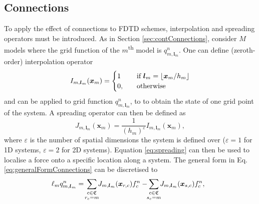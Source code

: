 \documentclass{article}
\begin{document}

\subsection{Connections}\label{sec:discConnections}

To apply the effect of connections to FDTD schemes, interpolation and spreading operators must be introduced. As in Section \ref{sec:contConnections}, consider $M$ models where the grid function of the $m$\textsuperscript{th} model is $q_{m, \boldsymbol{l}_m}^n$. One can define (zeroth-order) interpolation operator
\begin{equation}
    I_{m, \boldsymbol{l}_m}(\boldsymbol{x}_m) = \begin{cases}
    1&\quad \text{if}\ \boldsymbol{l}_m= \floor[\boldsymbol{x}_m/h_m]\\
    0, &\quad\text{otherwise}
    \end{cases}
\end{equation}
and can be applied to grid function $q_{m, \boldsymbol{l}_m}^n$, to to obtain the state of one grid point of the system. A spreading operator can then be defined as
\begin{equation}\label{eq:spreading}
    J_{m, \boldsymbol{l}_m}(\boldsymbol{x}_m) = \frac{1}{(h_m)^\varepsilon}I_{m, \boldsymbol{l}_m}(\boldsymbol{x}_m),
\end{equation}
where $\varepsilon$ is the number of spatial dimensions the system is defined over ($\varepsilon = 1$ for 1D systems, $\varepsilon = 2$ for 2D systems). Equation \eqref{eq:spreading} can then be used to localise a force onto a specific location along a system. 
The general form in Eq. \eqref{eq:generalFormConnections} can be discretised to
\begin{equation}\label{eq:generalFormConnectionsDisc}
    \!\!\!\ell_mq_{m, \boldsymbol{l}_m}^n =\!\sum_{\substack{c\in \mathfrak{C}\vspace{0.1em}\\ r_c = m}}\!\! J_{m, \boldsymbol{l}_m}(\boldsymbol{x}_{r, c}) f_c^n-\!\! \sum_{\substack{c\in \mathfrak{C}\vspace{0.1em}\\ s_c = m}}\!\! J_{m, \boldsymbol{l}_m}(\boldsymbol{x}_{s, c}) f_c^n,
\end{equation}
\end{document}
